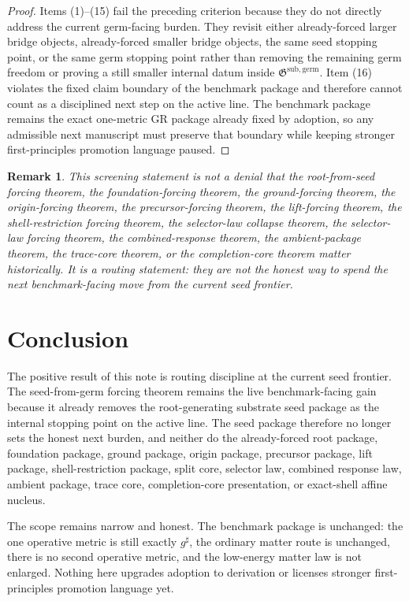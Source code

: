 \documentclass[11pt]{article}
\newcommand{\CompletedMetric}{g^{\sharp}}
\newcommand{\GermPackage}{\mathfrak G^{\mathrm{sub,germ}}}
\newtheorem{remark}{Remark}
\begin{document}
\begin{proof}
Items (1)--(15) fail the preceding criterion because they do not directly address the current germ-facing burden. They revisit either already-forced larger bridge objects, already-forced smaller bridge objects, the same seed stopping point, or the same germ stopping point rather than removing the remaining germ freedom or proving a still smaller internal datum inside \(\GermPackage\). Item (16) violates the fixed claim boundary of the benchmark package and therefore cannot count as a disciplined next step on the active line. The benchmark package remains the exact one-metric GR package already fixed by adoption, so any admissible next manuscript must preserve that boundary while keeping stronger first-principles promotion language paused.
\end{proof}

\begin{remark}
This screening statement is not a denial that the root-from-seed forcing theorem, the foundation-forcing theorem, the ground-forcing theorem, the origin-forcing theorem, the precursor-forcing theorem, the lift-forcing theorem, the shell-restriction forcing theorem, the selector-law collapse theorem, the selector-law forcing theorem, the combined-response theorem, the ambient-package theorem, the trace-core theorem, or the completion-core theorem matter historically. It is a routing statement: they are not the honest way to spend the next benchmark-facing move from the current seed frontier.
\end{remark}

\section{Conclusion}

The positive result of this note is routing discipline at the current seed frontier. The seed-from-germ forcing theorem remains the live benchmark-facing gain because it already removes the root-generating substrate seed package as the internal stopping point on the active line. The seed package therefore no longer sets the honest next burden, and neither do the already-forced root package, foundation package, ground package, origin package, precursor package, lift package, shell-restriction package, split core, selector law, combined response law, ambient package, trace core, completion-core presentation, or exact-shell affine nucleus.

The scope remains narrow and honest. The benchmark package is unchanged: the one operative metric is still exactly \(\CompletedMetric\), the ordinary matter route is unchanged, there is no second operative metric, and the low-energy matter law is not enlarged. Nothing here upgrades adoption to derivation or licenses stronger first-principles promotion language yet.
\end{document}
